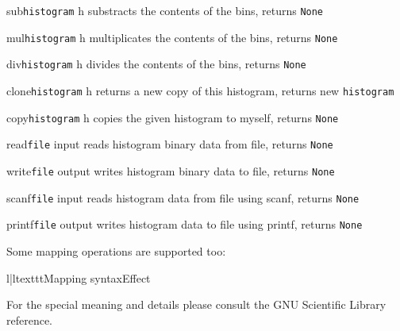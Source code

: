 \begin{methoddesc}{sub}{\texttt{histogram} h}
substracts the contents of the bins, \hfill returns \texttt{None}
\end{methoddesc}
\begin{methoddesc}{mul}{\texttt{histogram} h}
multiplicates the contents of the bins, \hfill returns \texttt{None}
\end{methoddesc}
\begin{methoddesc}{div}{\texttt{histogram} h}
divides the contents of the bins, \hfill returns \texttt{None}
\end{methoddesc}
\begin{methoddesc}{clone}{\texttt{histogram} h}
returns a new copy of this histogram, \hfill returns new \texttt{histogram}
\end{methoddesc}
\begin{methoddesc}{copy}{\texttt{histogram} h}
copies the given histogram to myself, \hfill returns \texttt{None}
\end{methoddesc}
\begin{methoddesc}{read}{\texttt{file} input}
reads histogram binary data from file, \hfill returns \texttt{None}
\end{methoddesc}
\begin{methoddesc}{write}{\texttt{file} output}
writes histogram binary data to file, \hfill returns \texttt{None}
\end{methoddesc}
\begin{methoddesc}{scanf}{\texttt{file} input}
reads histogram data from file using scanf, \hfill returns \texttt{None}
\end{methoddesc}
\begin{methoddesc}{printf}{\texttt{file} output}
writes histogram data to file using printf, \hfill returns \texttt{None}
\end{methoddesc}


Some mapping operations are supported too:\nopagebreak
\begin{tableii}{l|l}{texttt}{Mapping syntax}{Effect}
\end{tableii}

\begin{seealso}
For the special meaning and details please consult the GNU Scientific Library
reference.
\end{seealso}


